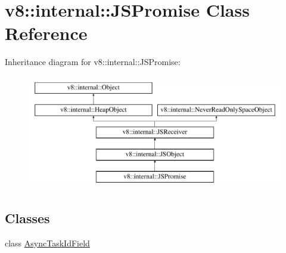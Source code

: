 \hypertarget{classv8_1_1internal_1_1JSPromise}{}\section{v8\+:\+:internal\+:\+:J\+S\+Promise Class Reference}
\label{classv8_1_1internal_1_1JSPromise}
Inheritance diagram for v8\+:\+:internal\+:\+:J\+S\+Promise\+:\begin{figure}[H]
\begin{center}
\leavevmode
\includegraphics[height=5.000000cm]{classv8_1_1internal_1_1JSPromise}
\end{center}
\end{figure}
\subsection*{Classes}
\begin{DoxyCompactItemize}
\item 
class \mbox{\hyperlink{classv8_1_1internal_1_1JSPromise_1_1AsyncTaskIdField}{Async\+Task\+Id\+Field}}
\end{DoxyCompactItemize}
